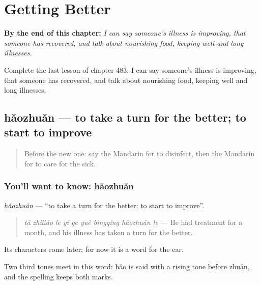 
\chapter{Getting Better}
\label{ch:zh-getting-better}

\begin{chapteropening}
\textbf{By the end of this chapter:} \emph{I can say someone's illness is improving, that someone has recovered, and talk about nourishing food, keeping well and long illnesses.}

Complete the last lesson of chapter 483: I can say someone's illness is improving, that someone has recovered, and talk about nourishing food, keeping well and long illnesses.
\end{chapteropening}

\section[hǎozhuǎn]{hǎozhuǎn — to take a turn for the better; to start to improve}

\label{lesson:ZH-C483-haozhuan}



\begin{quote}
Before the new one: say the Mandarin for to disinfect, then the Mandarin for to care for the sick.
\end{quote}

\subsection*{You'll want to know: hǎozhuǎn}
\emph{hǎozhuǎn} — \textquotedblleft{}to take a turn for the better; to start to improve\textquotedblright{}.

\begin{quote}
\emph{tā zhìliáo le yí ge yuè bìngqíng hǎozhuǎn le} — He had treatment for a month, and his illness has taken a turn for the better.
\end{quote}

Its characters come later; for now it is a word for the ear.

Two third tones meet in this word: hǎo is said with a rising tone before zhuǎn, and the spelling keeps both marks.

